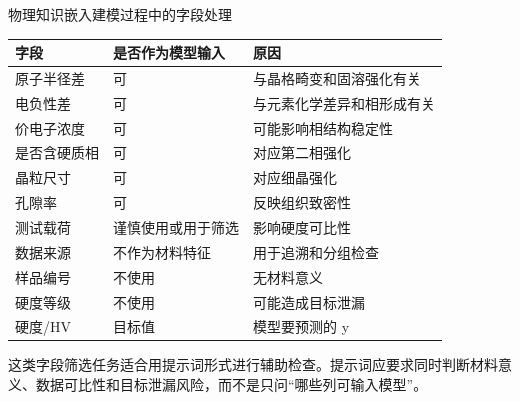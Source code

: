 \begin{formalTable}[htbp]
\caption{物理知识嵌入建模过程中的字段处理}
\label{tab:physics-informed-field-treatment}
\begin{tabularx}{\textwidth}{@{}YYY@{}}
\toprule
\textbf{字段} & \textbf{是否作为模型输入} & \textbf{原因} \\
\midrule
原子半径差 & 可 & 与晶格畸变和固溶强化有关 \\
电负性差 & 可 & 与元素化学差异和相形成有关 \\
价电子浓度 & 可 & 可能影响相结构稳定性 \\
是否含硬质相 & 可 & 对应第二相强化 \\
晶粒尺寸 & 可 & 对应细晶强化 \\
孔隙率 & 可 & 反映组织致密性 \\
测试载荷 & 谨慎使用或用于筛选 & 影响硬度可比性 \\
数据来源 & 不作为材料特征 & 用于追溯和分组检查 \\
样品编号 & 不使用 & 无材料意义 \\
硬度等级 & 不使用 & 可能造成目标泄漏 \\
硬度/HV & 目标值 & 模型要预测的 y \\
\bottomrule
\end{tabularx}
\end{formalTable}

这类字段筛选任务适合用提示词形式进行辅助检查。提示词应要求同时判断材料意义、数据可比性和目标泄漏风险，而不是只问“哪些列可输入模型”。

